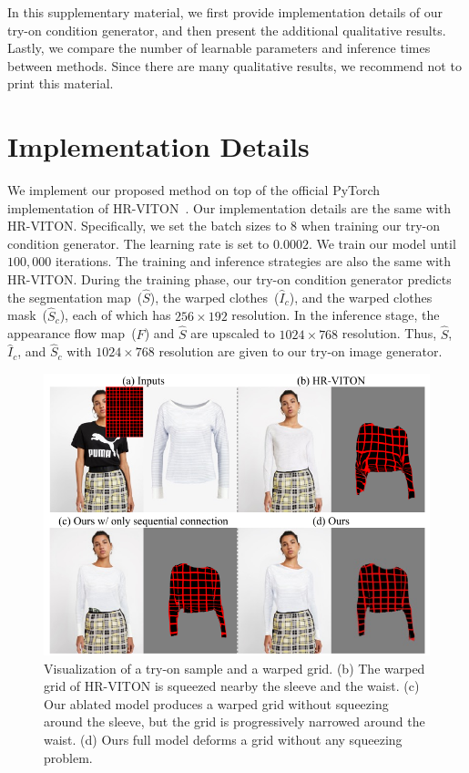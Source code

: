 
In this supplementary material, we first provide implementation details of our try-on condition generator, and then present the additional qualitative results.
Lastly, we compare the number of learnable parameters and inference times between methods.
Since there are many qualitative results, we recommend not to print this material.

\section{Implementation Details}
We implement our proposed method on top of the official PyTorch implementation of HR-VITON~\cite{lee2022hrviton}.
Our implementation details are the same with HR-VITON.
Specifically, we set the batch sizes to $8$ when training our try-on condition generator.
The learning rate is set to $0.0002$. 
We train our model until $100,000$ iterations.
The training and inference strategies are also the same with HR-VITON.
During the training phase, our try-on condition generator predicts the segmentation map~($\hat{S}$), the warped clothes~($\hat{I}_c$), and the warped clothes mask~($\hat{S}_c$), each of which has $256 \times 192$ resolution.
In the inference stage, the appearance flow map~($F$) and $\hat{S}$ are upscaled to $1024 \times 768$ resolution.
Thus, $\hat{S}$, $\hat{I}_c$, and $\hat{S}_c$ with $1024 \times 768$ resolution are given to our try-on image generator.

\begin{figure}[t]
	\centering
    \includegraphics[width=\linewidth]{fig_supp/fig8.pdf}    
    \caption{Visualization of a try-on sample and a warped grid. (b) The warped grid of HR-VITON is squeezed nearby the sleeve and the waist. (c) Our ablated model produces a warped grid without squeezing around the sleeve, but the grid is progressively narrowed around the waist. (d) Ours full model deforms a grid without any squeezing problem.}
	\label{fig_warped_grid}
\end{figure}


